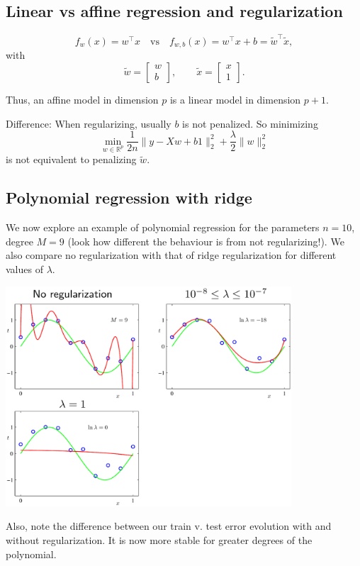 \subsection*{Linear vs affine regression and regularization}
\[
f_w(x) = w^\top x
\quad\text{vs}\quad
f_{w,b}(x) = w^\top x + b = \tilde w^\top \tilde x,
\]
with
\[
\tilde w = \begin{bmatrix} w \\ b \end{bmatrix}, \qquad 
\tilde x = \begin{bmatrix} x \\ 1 \end{bmatrix}.
\]

Thus, an affine model in dimension $p$ is a linear model in dimension $p+1$.

\medskip

\noindent Difference: When regularizing, usually $b$ is not penalized.  
So minimizing
\[
\min_{w\in\mathbb{R}^p} \frac{1}{2n}\|y - Xw + b1\|_2^2 + \frac{\lambda}{2}\|w\|_2^2
\]
is not equivalent to penalizing $\tilde w$.

\subsection*{Polynomial regression with ridge}
We now explore an example of polynomial regression for the parameters $n=10$, degree $M=9$ (look how different the behaviour is from not regularizing!). We also compare
 no regularization with that of ridge regularization for different values of $\lambda$.

\includegraphics[width=0.8\textwidth]{figures/poly_ridge_examples.png}

Also, note the difference between our train v. test error evolution with and without regularization. It is now more stable for greater degrees of the polynomial.

